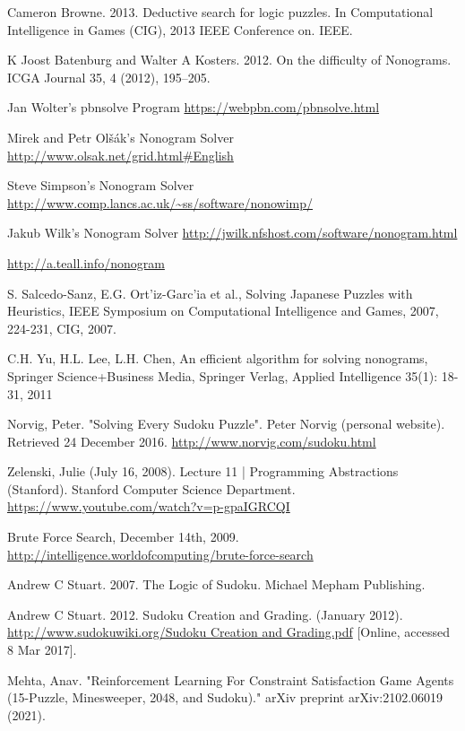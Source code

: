 \documentclass{svproc}
\begin{document}
\begin{thebibliography}{6}

Cameron Browne. 2013. Deductive search for logic puzzles. In Computational
Intelligence in Games (CIG), 2013 IEEE Conference on. IEEE.

K Joost Batenburg and Walter A Kosters. 2012. On the difficulty of Nonograms.
ICGA Journal 35, 4 (2012), 195–205.

Jan Wolter's pbnsolve Program
\url{https://webpbn.com/pbnsolve.html}

Mirek and Petr Olšák's Nonogram Solver
\url{http://www.olsak.net/grid.html#English}

Steve Simpson's Nonogram Solver
\url{http://www.comp.lancs.ac.uk/~ss/software/nonowimp/}

Jakub Wilk's Nonogram Solver
\url{http://jwilk.nfshost.com/software/nonogram.html}

\url{http://a.teall.info/nonogram}

S. Salcedo-Sanz, E.G. Ort’iz-Garc’ia et al., Solving Japanese Puzzles with
Heuristics, IEEE Symposium on Computational Intelligence and Games,
2007, 224-231, CIG, 2007.

C.H. Yu, H.L. Lee, L.H. Chen, An efficient algorithm for solving nonograms, Springer Science+Business Media, Springer Verlag, Applied Intelligence 35(1): 18-31, 2011

Norvig, Peter. "Solving Every Sudoku Puzzle". Peter Norvig (personal website). Retrieved 24 December 2016.
\url{http://www.norvig.com/sudoku.html}

Zelenski, Julie (July 16, 2008). Lecture 11 | Programming Abstractions (Stanford). Stanford Computer Science Department.
\url{https://www.youtube.com/watch?v=p-gpaIGRCQI}

Brute Force Search, December 14th, 2009.
\url{http://intelligence.worldofcomputing/brute-force-search}

Andrew C Stuart. 2007. The Logic of Sudoku. Michael Mepham Publishing.

Andrew C Stuart. 2012. Sudoku Creation and Grading. (January 2012).
\url{http://www.sudokuwiki.org/Sudoku Creation and Grading.pdf}
[Online, accessed 8 Mar 2017].

Mehta, Anav. "Reinforcement Learning For Constraint Satisfaction Game Agents (15-Puzzle, Minesweeper, 2048, and Sudoku)." arXiv preprint arXiv:2102.06019 (2021).


\end{thebibliography}
\end{document}
